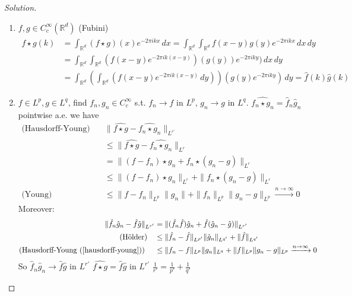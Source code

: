 \documentclass{report}
\theoremstyle{tommy}
\begin{document}
  \begin{proof}[Solution] \
    \begin{enumerate}[label=Step \arabic*)]
      \item \(f, g \in C_c^\infty(\mathbb{R}^d)\) (Fubini)
      \begin{align*}
        \widehat{f \star g}(k) &= \int_{\mathbb{R}^d} (f \star g)(x) e^{-2 \pi i k x} \, dx = \int_{\mathbb{R}^d}\int_{\mathbb{R}^d} f(x-y) g(y) e^{-2 \pi i kx} \, dx \, dy \\
        &= \int_{\mathbb{R}^d}\int_{\mathbb{R}^d} \left(f(x-y) e^{- 2 \pi i k(x-y)}\right) (g(y)) e^{- 2 \pi i k y}) \, dx \, dy \\
        &= \int_{\mathbb{R}^d} \left(\int_{\mathbb{R}^d} (f(x-y) e^{- 2 \pi i k (x-y)} \, dy)\right) (g(y) e^{ - 2 \pi i k y}) \, dy = \hat f(k) \hat g(k)
      \end{align*}
      \item \(f \in L^p, g \in L^q\), find \(f_n, g_n \in C_c^\infty\) s.t. \(f_n \to f\) in \(L^p\), \(g_n \to g\) in \(L^q\). \(\widehat{f_n \star g_n} = \hat f_n \hat g_n\) pointwise a.e. we have
      \begin{align*}
        \text{(Hausdorff-Young)} \quad &\|\widehat{f \star g} - \widehat{f_n \star g_n}\|_{L^{r'}} \\
        &\le \|\widehat{f \star g} - \widehat{f_n \star g_n}\|_{L^r} \\
        &= \|(f - f_n) \star g_n + f_n \star (g_n - g) \|_{L^r} \\
        &\le \| (f-f_n) \star g_n \|_{L^r} + \| f_n \star (g_n - g)\|_{L^r} \\
        \text{(Young)} &\le \|f - f_n\|_{L^p} \|g_n\| + \|f_n\|_{L^p} \|g_n - g\|_{L^p} \xrightarrow{n \to \infty} 0
      \end{align*}
      Moreover:
      \begin{align*}
        \|\hat f_n \hat g_n - \hat f \hat g \|_{L^{r'}} 
        &= \|(\hat f_n \hat f)\hat g_n + \hat f (\hat g_n - \hat g) \|_{L^{r'}} \\
        \text{(Hölder)} \quad &\le \|\hat f_n - \hat f \|_{L^{p'}} \| \hat g_n \|_{L^{q'}} + \| \hat f \|_{L^{q'}} \\
        \text{(Hausdorff-Young (\ref{hausdorff-young}))} \quad &\le \| f_n - f \|_{L^p}\|g_n\|_{L^q} + \|f\|_{L^p} \|g_n - g\|_{L^p} \xrightarrow{n \to \infty} 0
      \end{align*}
      So \(\hat f_n \hat g_n \to \hat f \hat g \text{ in } L^{r'}\)
      \(\widehat{f \star g} = \hat f \hat g\) in \(L^{r'}\)
      \(\frac{1}{r'} = \frac{1}{p'} + \frac{1}{q'}\) \qedhere
    \end{enumerate}
  \end{proof}
  
\end{document}

